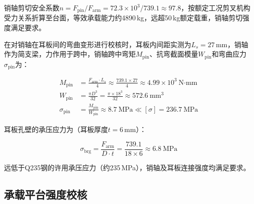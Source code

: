 {{销轴剪切安全系数$n = F_{\text{pin}}/F_{\text{arm}} = 72.3\times10^{3}/739.1 \approx 97.8$，按额定工况剪叉机构受力关系折算至台面，等效承载能力约4890\,kg，远超50\,kg额定载重，销轴剪切强度满足要求。

在对销轴在耳板间的弯曲变形进行校核时，耳板内间距实测为$L_{s} = 27$\,mm，销轴作为简支梁，力作用于跨中，销轴跨中弯矩$M_{\text{pin}}$、抗弯截面模量$W_{\text{pin}}$和弯曲应力$\sigma_{\text{pin}}$为：

\begin{align}
    M_{\text{pin}} &= \frac{F_{\text{arm}} \cdot L_{s}}{4} \approx \frac{739.1 \times 27}{4} \approx 4.99 \times 10^{3}\ \text{N·mm} \\
    W_{\text{pin}} &= \frac{\pi D^{3}}{32} = \frac{\pi \times 18^{3}}{32} \approx 572.6\ \text{mm}^{3} \\
    \sigma_{\text{pin}} &= \frac{M_{\text{pin}}}{W_{\text{pin}}} \approx 8.7\ \text{MPa} \ll [\sigma] = 236.7\ \text{MPa}
\end{align}

耳板孔壁的承压应力为（耳板厚度$t = 6$\,mm）：

\begin{equation}
    \sigma_{\text{brg}} = \frac{F_{\text{arm}}}{D \cdot t} = \frac{739.1}{18 \times 6} \approx 6.8\ \text{MPa}
    \label{eq:brg}
\end{equation}

远低于Q235钢的许用承压应力（约235\,MPa），销轴及耳板连接强度均满足要求。}

\subsection{承载平台强度校核}

}
